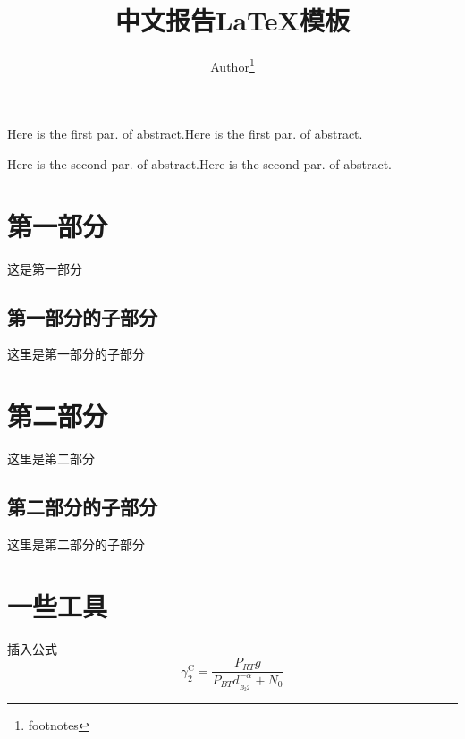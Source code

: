 \documentclass[UTF8,a4paper,12pt]{ctexart}
\title{\textbf{\Large{中文报告\LaTeX{}模板}}}
\author{ Author\thanks{footnotes} }
\begin{document}
 
\maketitle
 
 
 
\begin{adjustwidth}{1cm}{1cm}
\hspace{1.5em}Here is the first par. of abstract.Here is the first par. of abstract.
 
\noindent\hspace{1.5em}Here is the second par. of abstract.Here is the second par. of abstract.
\end{adjustwidth}
 
 
 
\section{第一部分}
这是第一部分
\subsection{第一部分的子部分}
这里是第一部分的子部分
 
\section{第二部分}
这里是第二部分 \cite{ref1,ref2}
\subsection{第二部分的子部分}
这里是第二部分的子部分
 
\section{一些工具}
插入公式
\begin{equation}\label{eq}
  \gamma _2^{\text{C}} = \frac{{{P_{RT}}g}}{{{P_{BT}}d_{_{{B_2}2}}^{ - \alpha } + {N_0}}}
\end{equation}
 
\end{document}

